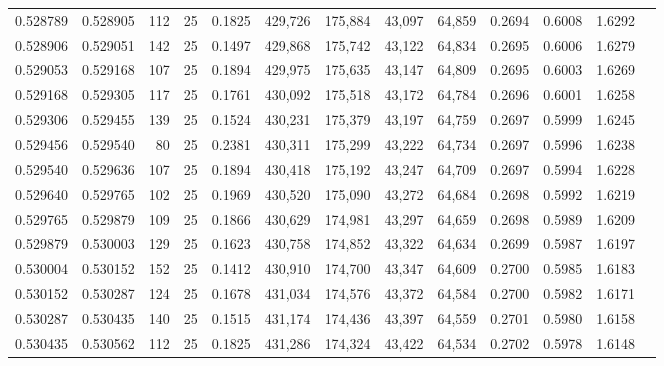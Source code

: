 \begin{tabular}{rrrrrrrrrrrrr}
0.528789 & 0.528905 &   112 &  25 &                                     0.1825 & 429,726 & 175,884 &  43,097 &  64,859 & 0.2694 & 0.6008 & 1.6292 \\
0.528906 & 0.529051 &   142 &  25 &                                     0.1497 & 429,868 & 175,742 &  43,122 &  64,834 & 0.2695 & 0.6006 & 1.6279 \\
0.529053 & 0.529168 &   107 &  25 &                                     0.1894 & 429,975 & 175,635 &  43,147 &  64,809 & 0.2695 & 0.6003 & 1.6269 \\
0.529168 & 0.529305 &   117 &  25 &                                     0.1761 & 430,092 & 175,518 &  43,172 &  64,784 & 0.2696 & 0.6001 & 1.6258 \\
0.529306 & 0.529455 &   139 &  25 &                                     0.1524 & 430,231 & 175,379 &  43,197 &  64,759 & 0.2697 & 0.5999 & 1.6245 \\
0.529456 & 0.529540 &    80 &  25 &                                     0.2381 & 430,311 & 175,299 &  43,222 &  64,734 & 0.2697 & 0.5996 & 1.6238 \\
0.529540 & 0.529636 &   107 &  25 &                                     0.1894 & 430,418 & 175,192 &  43,247 &  64,709 & 0.2697 & 0.5994 & 1.6228 \\
0.529640 & 0.529765 &   102 &  25 &                                     0.1969 & 430,520 & 175,090 &  43,272 &  64,684 & 0.2698 & 0.5992 & 1.6219 \\
0.529765 & 0.529879 &   109 &  25 &                                     0.1866 & 430,629 & 174,981 &  43,297 &  64,659 & 0.2698 & 0.5989 & 1.6209 \\
0.529879 & 0.530003 &   129 &  25 &                                     0.1623 & 430,758 & 174,852 &  43,322 &  64,634 & 0.2699 & 0.5987 & 1.6197 \\
0.530004 & 0.530152 &   152 &  25 &                                     0.1412 & 430,910 & 174,700 &  43,347 &  64,609 & 0.2700 & 0.5985 & 1.6183 \\
0.530152 & 0.530287 &   124 &  25 &                                     0.1678 & 431,034 & 174,576 &  43,372 &  64,584 & 0.2700 & 0.5982 & 1.6171 \\
0.530287 & 0.530435 &   140 &  25 &                                     0.1515 & 431,174 & 174,436 &  43,397 &  64,559 & 0.2701 & 0.5980 & 1.6158 \\
0.530435 & 0.530562 &   112 &  25 &                                     0.1825 & 431,286 & 174,324 &  43,422 &  64,534 & 0.2702 & 0.5978 & 1.6148 \\

\end{tabular}
